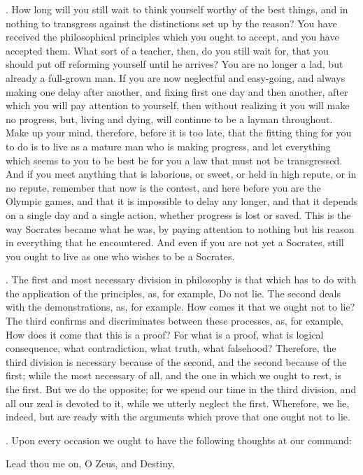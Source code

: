 . How long will you still wait to think yourself worthy of the best things, and in nothing to transgress against the distinctions set up by the reason? You have received the philosophical principles which you ought to accept, and you have accepted them. What sort of a teacher, then, do you still wait for, that you should put off reforming yourself until he arrives? You are no longer a lad, but already a full-grown man. If you are now neglectful and easy-going, and always making one delay after another, and fixing first one day and then another, after which you will pay attention to yourself, then without realizing it you will make no progress, but, living and dying, will continue to be a layman throughout. Make up your mind, therefore, before it is too late, that the fitting thing for you to do is to live as a mature man who is making progress, and let everything which seems to you to be best be for you a law that must not be transgressed. And if you meet anything that is laborious, or sweet, or held in high repute, or in no repute, remember that now is the contest, and here before you are the Olympic games, and that it is impossible to delay any longer, and that it depends on a single day and a single action, whether progress is lost or saved. This is the way Socrates became what he was, by paying attention to nothing but his reason in everything that he encountered. And even if you are not yet a Socrates, still you ought to live as one who wishes to be a Socrates.

. The first and most necessary division in philosophy is that which has to do with the application of the principles, as, for example, Do not lie. The second deals with the demonstrations, as, for example. How comes it that we ought not to lie? The third confirms and discriminates between these processes, as, for example, How does it come that this is a proof? For what is a proof, what is logical consequence, what contradiction, what truth, what falsehood? Therefore, the third division is necessary because of the second, and the second because of the first; while the most necessary of all, and the one in which we ought to rest, is the first. But we do the opposite; for we spend our time in the third division, and all our zeal is devoted to it, while we utterly neglect the first. Wherefore, we lie, indeed, but are ready with the arguments which prove that one ought not to lie.

. Upon every occasion we ought to have the following thoughts at our command:

Lead thou me on, O Zeus, and Destiny,

